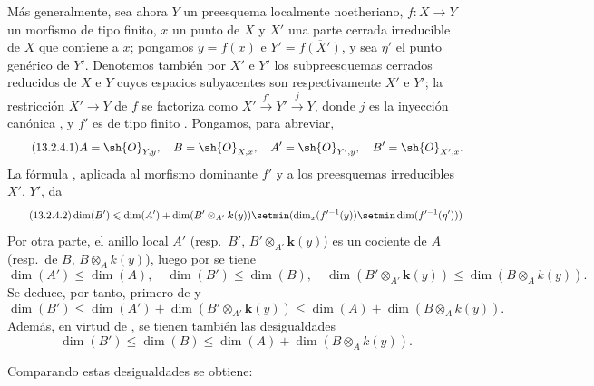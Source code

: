 \begin{env}[13.2.4]
\label{IV.13.2.4}
Más generalmente, sea ahora $Y$ un preesquema localmente noetheriano, $f:X\to Y$ un morfismo de tipo finito, $x$ un punto de $X$ y $X'$ una parte cerrada irreducible de $X$ que contiene a $x$; pongamos $y=f(x)$ e $Y'=\overline{f(X')}$, y sea $\eta'$ el punto genérico de $Y'$.
Denotemos también por $X'$ e $Y'$ los subpreesquemas cerrados reducidos de $X$ e $Y$ cuyos espacios subyacentes son respectivamente $X'$ e $Y'$; la restricción $X'\to Y$ de $f$ se factoriza como $X'\xrightarrow{f'}Y'\xrightarrow{j}Y$, donde $j$ es la inyección canónica , y $f'$ es de tipo finito .
Pongamos, para abreviar,
\[
\label{IV.13.2.4.1}
\tag{13.2.4.1}
  A=\sh{O}_{Y,y},\quad B=\sh{O}_{X,x},\quad A'=\sh{O}_{Y',y},\quad B'=\sh{O}_{X',x}.
\]
La fórmula , aplicada al morfismo dominante $f'$ y a los preesquemas irreducibles $X'$, $Y'$, da
\[
\label{IV.13.2.4.2}
\tag{13.2.4.2}
  \dim(B')\leq\dim(A')+\dim(B'\otimes_{A'}\boldsymbol k(y))\setmin(\dim_x(f'^{-1}(y))\setmin\dim(f'^{-1}(\eta')))
\]
Por otra parte, el anillo local $A'$ (resp.\ $B'$, $B'\otimes_{A'}\boldsymbol k(y)$) es un cociente de $A$ (resp.\ de $B$, $B\otimes_A k(y)$), luego por  se tiene
\[
\tag{13.2.4.3}
\label{IV.13.2.4.3}
  \dim(A')\leq\dim(A),\quad \dim(B')\leq\dim(B),\quad \dim(B'\otimes_{A'}\boldsymbol k(y))\leq\dim(B\otimes_A k(y)).
\]
Se deduce, por tanto, primero de  y 
\[
\label{IV.13.2.4.4}
\tag{13.2.4.4}
  \dim(B')\leq\dim(A')+\dim(B'\otimes_{A'}\boldsymbol k(y))\leq\dim(A)+\dim(B\otimes_A k(y)).
\]
Además, en virtud de , se tienen también las desigualdades
\[
\label{IV.13.2.4.5}
\tag{13.2.4.5}
  \dim(B')\leq\dim(B)\leq\dim(A)+\dim(B\otimes_A k(y)).
\]
\end{env}


Comparando estas desigualdades se obtiene:

